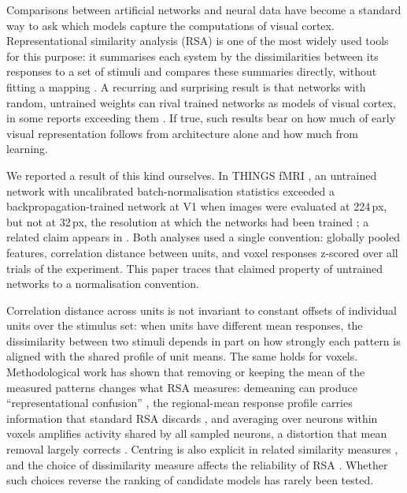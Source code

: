 Comparisons between artificial networks and neural data have become a standard way to ask which
models capture the computations of visual cortex. Representational similarity analysis (RSA) is one
of the most widely used tools for this purpose: it summarises each system by the dissimilarities
between its responses to a set of stimuli and compares these summaries directly, without fitting a
mapping \citep{kriegeskorte2008}. A recurring and surprising result is that networks with random,
untrained weights can rival trained networks as models of visual cortex, in some reports exceeding
them \citep{truzzi2020, kazemian2025}. If true, such results bear on how much of early visual
representation follows from architecture alone and how much from learning.

We reported a result of this kind ourselves. In THINGS fMRI \citep{hebart2023}, an untrained network
with uncalibrated batch-normalisation statistics exceeded a backpropagation-trained network at V1
when images were evaluated at 224\,px, but not at 32\,px, the resolution at which the networks had
been trained \citep{evalres}; a related claim appears in \citet{leutenegger2026}. Both analyses used
a single convention: globally pooled features, correlation distance between units, and voxel
responses z-scored over all trials of the experiment. This paper traces that claimed property of
untrained networks to a normalisation convention.

Correlation distance across units is not invariant to constant offsets of individual units over the
stimulus set: when units have different mean responses, the dissimilarity between two stimuli depends
in part on how strongly each pattern is aligned with the shared profile of unit means. The same holds
for voxels. Methodological work has shown that removing or keeping the mean of the measured patterns
changes what RSA measures: demeaning can produce ``representational confusion''
\citep{ramirez2017}, the regional-mean response profile carries information that standard RSA
discards \citep{taylor2025}, and averaging over neurons within voxels amplifies activity shared by
all sampled neurons, a distortion that mean removal largely corrects \citep{bossio2025}. Centring is
also explicit in related similarity measures \citep{kornblith2019}, and the choice of dissimilarity
measure affects the reliability of RSA \citep{walther2016, diedrichsen2017}. Whether such choices
reverse the ranking of candidate models has rarely been tested.

